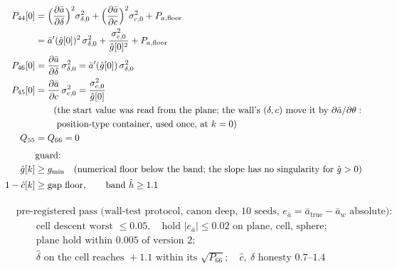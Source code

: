 \documentclass[11pt,a4paper,fontset=none]{ctexart}
\newcommand{\ba}{\bar{a}}
\newcommand{\ap}{\ba'}
\newcommand{\ah}{\hat{\ba}_w}
\newcommand{\hh}{\hat{h}}
\newcommand{\ch}{\hat{c}}
\newcommand{\dl}{\delta}
\newcommand{\dlh}{\hat{\delta}}
\newcommand{\gh}{\hat{g}}
\begin{document}
\begin{align*}
P_{44}[0] &= \Bigl(\frac{\partial\ba}{\partial\dl}\Bigr)^{2}\sigma_{\dl,0}^{2} + \Bigl(\frac{\partial\ba}{\partial c}\Bigr)^{2}\sigma_{c,0}^{2} + P_{a,\mathrm{floor}} \\
          &= \ap(\gh[0])^{2}\,\sigma_{\dl,0}^{2} + \frac{\sigma_{c,0}^{2}}{\gh[0]^{2}} + P_{a,\mathrm{floor}} \\
P_{46}[0] &= \frac{\partial\ba}{\partial\dl}\,\sigma_{\dl,0}^{2} = \ap(\gh[0])\,\sigma_{\dl,0}^{2} \\
P_{45}[0] &= \frac{\partial\ba}{\partial c}\,\sigma_{c,0}^{2} = \frac{\sigma_{c,0}^{2}}{\gh[0]} \\
          &\qquad(\text{the start value was read from the plane; the wall's } (\dl, c) \text{ move it by } \partial\ba/\partial\theta: \\
          &\qquad\ \text{position-type container, used once, at } k = 0) \\
Q_{55} &= Q_{66} = 0 \\[4pt]
&\text{guard:} \\
\gh[k] &\ge g_{\min} \quad(\text{numerical floor below the band; the slope has no singularity for } \gh > 0) \\
1 - \ch[k] &\ge \text{gap floor}, \qquad \text{band } \hh \ge 1.1
\end{align*}

\begin{align*}
&\text{pre-registered pass (wall-test protocol, canon deep, 10 seeds, } e_{\ba} = \ba_{\mathrm{true}} - \ah \text{ absolute):} \\
&\qquad \text{cell descent worst } \le 0.05,\quad \text{hold } |e_{\ba}| \le 0.02 \text{ on plane, cell, sphere;} \\
&\qquad \text{plane hold within } 0.005 \text{ of version 2;} \\
&\qquad \dlh \text{ on the cell reaches } +1.1 \text{ within its } \sqrt{P_{66}};\quad \hat c,\ \dlh \text{ honesty } 0.7\text{--}1.4
\end{align*}
\end{document}
